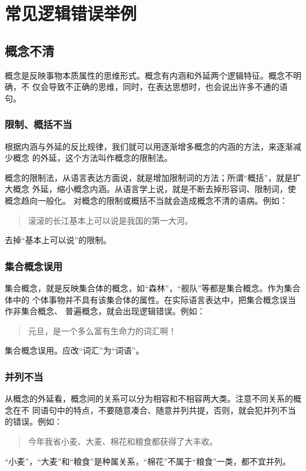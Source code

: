 \documentclass[final,oneside]{ctexbook}
\newenvironment{equotation}{\begin{quotation}\kaishu}{\end{quotation}}
\begin{document}
\section{常见逻辑错误举例}

\subsection{概念不清}

概念是反映事物本质属性的思维形式。概念有内涵和外延两个逻辑特征。概念不明确，不
仅会导致不正确的思维，同时，在表达思想时，也会说出许多不通的语句。

\subsubsection{限制、概括不当}

根据内涵与外延的反比规律，我们就可以用逐渐增多概念的内涵的方法，来逐渐减少概念
的外延，这个方法叫作概念的限制法。

概念的限制法，从语言表达方面说，就是增加限制词的方法；所谓“概括”，就是扩大概念
外延，缩小概念内涵。从语言学上说，就是不断去掉形容词、限制词，使概念趋向一般化。
对概念的限制或概括不当就会造成概念不清的语病。例如：
\begin{equotation}
  滚滚的长江基本上可以说是我国的第一大河。
\end{equotation}
去掉“基本上可以说”的限制。

\subsubsection{集合概念误用}

集合概念，就是反映集合体的概念，如“森林”，“舰队”等都是集合概念。作为集合体中的
个体事物并不具有该集合体的属性。在实际语言表达中，把集合概念误当作非集合概念、
普遍概念，就会出现逻辑错误。例如：
\begin{equotation}
  元旦，是一个多么富有生命力的词汇啊！
\end{equotation}
集合概念误用。应改“词汇”为“词语”。

\subsubsection{并列不当}

从概念的外延看，概念间的关系可以分为相容和不相容两大类。注意不同关系的概念在不
同语句中的特点，不要随意凑合、随意并列共提，否则，就会犯并列不当的错误。例如：
\begin{equotation}
  今年我省小麦、大麦、棉花和粮食都获得了大丰收。
\end{equotation}
“小麦”，“大麦”和“粮食”是种属关系，“棉花”不属于“粮食”一类，都不宜并列。
\end{document}
